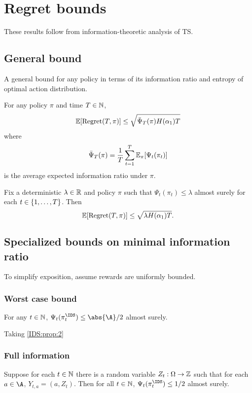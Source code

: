 \documentclass[11pt, openany]{book}
\DeclareMathOperator{\Regret}{Regret}
\begin{document}
\section{Regret bounds}
These results follow from information-theoretic analysis of TS.

\subsection{General bound}
A general bound for any policy in terms of its information ratio and entropy of optimal action distribution.

\begin{proposition}\label{IDS:prop:1}
    For any policy $\pi$ and time $T\in\mathbb{N}$,
    \[
        \E[\Regret(T,\pi)] \leq \sqrt{\bar{\Psi}_T(\pi) H(\alpha_1)T}
    \]
    where
    \[
        \bar\Psi_T(\pi) = \frac{1}{T}\sum_{t=1}^T \mathbb{E}_\pi [\Psi_t(\pi_t)]
    \]
    is the average expected information ratio under $\pi$.
\end{proposition}

\begin{corollary}\label{IDS:cor:1}
    Fix a deterministic $\lambda\in\mathbb{R}$ and policy $\pi$ such that $\Psi_t(\pi_t)\leq \lambda$ almost surely for each $t\in\left\lbrace1,\dots,T\right\rbrace$. Then
    \[
        \E[\Regret(T,\pi)] \leq \sqrt{\lambda H(\alpha_1)T}.
    \]
\end{corollary}

\subsection{Specialized bounds on minimal information ratio}
To simplify exposition, assume rewards are uniformly bounded.

\subsubsection{Worst case bound}
\begin{proposition}\label{IDS:prop:2}
    For any $t\in\mathbb{N}$, $\Psi_t(\pi_t^{\IDS}) \leq \abs{\A}/2$ almost surely.
\end{proposition}

Taking \cref{IDS:prop:2}

\subsubsection{Full information}
\begin{proposition}
    Suppose for each $t\in\mathbb{N}$ there is a random variable $Z_t:\Omega\to\mathbb{Z}$ such that for each $a\in\A$, $Y_{t,a} = (a,Z_t)$. Then for all $t\in\mathbb{N}$, $\Psi_t(\pi_t^{\IDS}) \leq 1/2$ almost surely.
\end{proposition}
\end{document}
